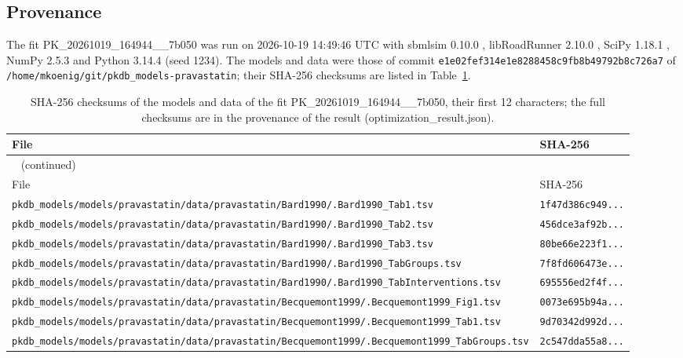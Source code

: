 \subsection{Provenance}

The fit PK\_20261019\_164944\_\_7b050 was run on 2026-10-19 14:49:46 UTC with sbmlsim 0.10.0 \cite{Koenig2026_sbmlsim}, libRoadRunner 2.10.0 \cite{Welsh2023}, SciPy 1.18.1 \cite{Virtanen2020}, NumPy 2.5.3 \cite{Harris2020} and Python 3.14.4 (seed 1234). The models and data were those of commit \texttt{e1e02fef314e1e8288458c9fb8b49792b8c726a7} of \texttt{/home/mkoenig/git/pkdb\_models-pravastatin}; their SHA-256 checksums are listed in Table~\ref{tab:checksums:PK_20261019_164944__7b050}.

\begin{longtable}{ll}
\caption{SHA-256 checksums of the models and data of the fit PK\_20261019\_164944\_\_7b050, their first 12 characters; the full checksums are in the provenance of the result (optimization\_result.json).}\label{tab:checksums:PK_20261019_164944__7b050} \\
\toprule
File & SHA-256 \\
\midrule
\endfirsthead
\multicolumn{2}{l}{\small\tablename~\thetable{} (continued)} \\
\toprule
File & SHA-256 \\
\midrule
\endhead
\bottomrule
\endlastfoot
\texttt{pkdb\_models/models/pravastatin/data/pravastatin/Bard1990/.Bard1990\_Tab1.tsv} & \texttt{1f47d386c949...} \\
\texttt{pkdb\_models/models/pravastatin/data/pravastatin/Bard1990/.Bard1990\_Tab2.tsv} & \texttt{456dce3af92b...} \\
\texttt{pkdb\_models/models/pravastatin/data/pravastatin/Bard1990/.Bard1990\_Tab3.tsv} & \texttt{80be66e223f1...} \\
\texttt{pkdb\_models/models/pravastatin/data/pravastatin/Bard1990/.Bard1990\_TabGroups.tsv} & \texttt{7f8fd606473e...} \\
\texttt{pkdb\_models/models/pravastatin/data/pravastatin/Bard1990/.Bard1990\_TabInterventions.tsv} & \texttt{695556ed2f4f...} \\
\texttt{pkdb\_models/models/pravastatin/data/pravastatin/Becquemont1999/.Becquemont1999\_Fig1.tsv} & \texttt{0073e695b94a...} \\
\texttt{pkdb\_models/models/pravastatin/data/pravastatin/Becquemont1999/.Becquemont1999\_Tab1.tsv} & \texttt{9d70342d992d...} \\
\texttt{pkdb\_models/models/pravastatin/data/pravastatin/Becquemont1999/.Becquemont1999\_TabGroups.tsv} & \texttt{2c547dda55a8...} \\

\end{longtable}
